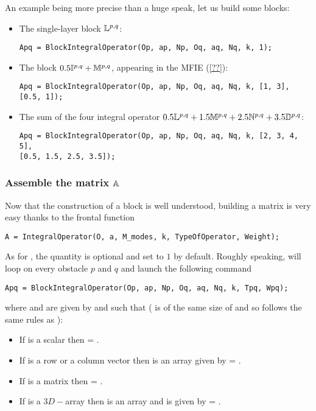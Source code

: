 An example being more precise than a huge speak, let us build some blocks:
\begin{itemize}
\item The single-layer block $\mathbb{L}^{p,q}$:
\begin{verbatim}
Apq = BlockIntegralOperator(Op, ap, Np, Oq, aq, Nq, k, 1);
\end{verbatim}
\item The block $0.5\mathbb{I}^{p,q} + \mathbb{M}^{p,q}$, appearing in the MFIE (\ref{??}):
\begin{verbatim}
Apq = BlockIntegralOperator(Op, ap, Np, Oq, aq, Nq, k, [1, 3], [0.5, 1]);
\end{verbatim}
\item The sum of the four integral operator $0.5\mathbb{L}^{p,q} + 1.5\mathbb{M}^{p,q} + 2.5\mathbb{N}^{p,q} + 3.5\mathbb{D}^{p,q}$:
\begin{verbatim}
Apq = BlockIntegralOperator(Op, ap, Np, Oq, aq, Nq, k, [2, 3, 4, 5], 
[0.5, 1.5, 2.5, 3.5]);
\end{verbatim}
\end{itemize}

\subsubsection{Assemble the matrix ${\mathbb{A}}$}

Now that the construction of a block is well understood, building a matrix is very easy thanks to the frontal function
\begin{verbatim}
A = IntegralOperator(O, a, M_modes, k, TypeOfOperator, Weight);
\end{verbatim}
As for , the quantity  is optional and set to $1$ by default. Roughly speaking,  will loop on every obstacle $p$ and $q$ and launch the following command
\begin{verbatim}
Apq = BlockIntegralOperator(Op, ap, Np, Oq, aq, Nq, k, Tpq, Wpq);
\end{verbatim}
where  and  are given by  and  such that ( is of the same size of  and so  follows the same rules as ):
\begin{itemize}
\item If  is a scalar then  = . 
\item If  is a row or a column vector then  is an array given by  = . 
\item If  is a matrix then  = . 
\item If  is a $3D-$array then  is an array and is given by  = . 
\end{itemize}

